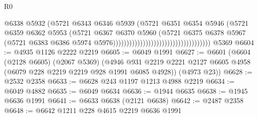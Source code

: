\begin{lexlean}{R0}
\begin{coremodule}
                                                                @6338
                                                                @5932
                                                                (@5721
                                                                  @6343
                                                                  @6346
                                                                  @5939
                                                                  (@5721
                                                                    @6351
                                                                    @6354
                                                                    @5946
                                                                    (@5721
                                                                      @6359
                                                                      @6362
                                                                      @5953
                                                                      (@5721
                                                                        @6367
                                                                        @6370
                                                                        @5960
                                                                        (@5721
                                                                          @6375
                                                                          @6378
                                                                          @5967
                                                                          (@5721
                                                                            @6383
                                                                            @6386
                                                                            @5974
                                                                            @5976))))))))))))))))))))))))))))))))))))
    @5369
@6604 := @4935 @1126 @2222 @2219
@6605 := @6049 @1991
@6627 := @6601
    (@6604
      (@2128 @6605)
      (@2067 @5369)
      (@4946 @931 @2219 @2221 @2127 @6605 @4958 (@6079 @228 @2219 @2219 @928 @1991 @6085 @4928))
      (@4973 @23))
@6628 := @2532 @2358
@6633 := @6628 @243 @1197 @1213 @4988 @2219
@6634 := @6049 @4882
@6635 := @6049 @6634
@6636 := @1944 @6635
@6638 := @1945 @6636 @1991
@6641 := @6633 @6638 (@2121 @6638)
@6642 := @2487 @2358
@6648 := @6642 @1211 @228 @4615 @2219 @6636 @1991

\end{coremodule}
\end{lexlean}

